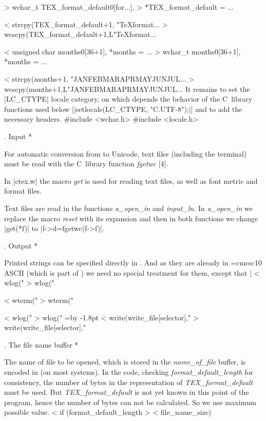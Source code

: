 > wchar_t       TEX_format_default0[for...],
>              *TEX_format_default = ...

< strcpy(TEX_format_default+1, "TeXformat...
> wcscpy(TEX_format_default+1,L"TeXformat...

< unsigned char months0[36+1], *months = ...
> wchar_t       months0[36+1], *months = ...

< strcpy(months+1, "JANFEBMARAPRMAYJUNJUL...
> wcscpy(months+1,L"JANFEBMARAPRMAYJUNJUL...
\endverbatim
\medskip
It remains to set the |LC_CTYPE| locale category, on which
depends the behavior of the C~library functions used below
||setlocale(LC_CTYPE, "C.UTF-8");||
and to add the necessary headers.
\verbatim
#include <wchar.h>
#include <locale.h>
\endverbatim

. Input *

For automatic conversion from  to Unicode,
text files (including the terminal) must be
read with the C~library function \hbox{\it fgetwc\/} [4].

In |ctex.w| the macro {\it get\/}
is used for reading text files, as well as
font metric and format files.

Text files are read in the functions
{\it a\_open\_in\/} and
{\it input\_ln\/}.
In
{\it a\_open\_in\/} we replace the macro
{\it reset\/}
with its expansion and then in both functions
we change |get(*f)| to |f->d=fgetwc(f->f)|.

. Output *

Printed strings can be specified directly in .
And as they are already in {\font\rm=cmcsc10 \rm ASCII} (which is
part of )
we need no special treatment for them,
except that |%
\verbatim
< wlog("%
> wlog("%

< wterm("%
> wterm("%

< wlog("%
> wlog("%
\endverbatim
\begingroup
\everyverbatim={\advance\parindent by -1.8pt }
\verbatim
< write(write_file[selector],"%
> write(write_file[selector],"%
\endverbatim
\endgroup

. The file name buffer *

The name of file to be opened, which is
stored in the {\it name\_of\_file\/} buffer,
is encoded in \hbox{} (on most systems).
\medskip
In the code, checking {\it format\_default\_length\/}
for consistency,
the number of bytes in the  representation of
{\it TEX\_format\_default\/} must be used.
But {\it TEX\_format\_default\/} is not yet known in this
point of the program,
hence the number of bytes can not be calculated.
So we use maximum possible value.
\verbatim
< if (format_default_length >
<     file_name_size)

